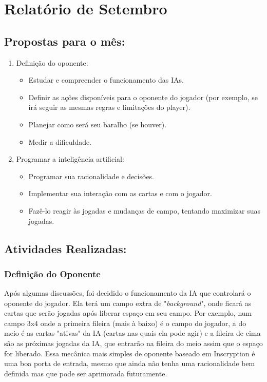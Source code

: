 \newpage
\section {Relatório de Setembro}

\subsection{Propostas para o mês:}
\begin{enumerate}
    \item Definição do oponente:
    \begin{itemize}
        \item Estudar e compreender o funcionamento das IAs.
        \item Definir as ações disponíveis para o oponente do jogador (por exemplo, se irá seguir as mesmas regras e limitações do player).
        \item Planejar como será seu baralho (se houver).
        \item Medir a dificuldade.
    \end{itemize}

    \item Programar a inteligência artificial:
    \begin{itemize}
        \item Programar sua racionalidade e decisões.
        \item Implementar sua interação com as cartas e com o jogador.
        \item Fazê-lo reagir às jogadas e mudanças de campo, tentando maximizar suas jogadas. 
    \end{itemize}
\end{enumerate}

\subsection{Atividades Realizadas:}

\subsubsection{Definição do Oponente}

Após algumas discussões, foi decidido o funcionamento da IA que controlará o oponente do jogador. Ela terá um campo extra de "\textit{background}", onde ficará as cartas que serão jogadas após liberar espaço em seu campo. Por exemplo, num campo 3x4 onde a primeira fileira (mais à baixo) é o campo do jogador, a do meio é as cartas "ativas" da IA (cartas nas quais ela pode agir) e a fileira de cima são as próximas jogadas da IA, que entrarão na fileira do meio assim que o espaço for liberado. Essa mecânica mais simples de oponente baseado em Inscryption é uma boa porta de entrada, mesmo que ainda não tenha uma racionalidade bem definida mas que pode ser aprimorada futuramente. 

